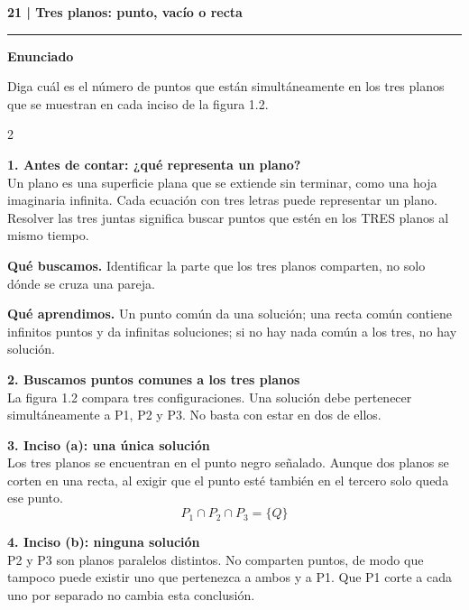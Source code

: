 \documentclass[11pt,a4paper,landscape]{article}
\newcommand{\titulo}[1]{{\LARGE\bfseries #1}\par\smallskip\hrule\medskip}
\begin{document}
\newpage{}\hypertarget{1.1-21}{}
\titulo{21 | Tres planos: punto, vacío o recta}
\textbf{Enunciado}\par Diga cuál es el número de puntos que están simultáneamente en los tres planos que se muestran en cada inciso de la figura 1.2.
\begin{multicols*}{2}
\noindent\begin{minipage}{\linewidth}\textbf{1. Antes de contar: ¿qué representa un plano?}\\[2pt]Un plano es una superficie plana que se extiende sin terminar, como una hoja imaginaria infinita. Cada ecuación con tres letras puede representar un plano. Resolver las tres juntas significa buscar puntos que estén en los TRES planos al mismo tiempo.
\par\smallskip\textbf{Qué buscamos.} Identificar la parte que los tres planos comparten, no solo dónde se cruza una pareja.
\par\smallskip\textbf{Qué aprendimos.} Un punto común da una solución; una recta común contiene infinitos puntos y da infinitas soluciones; si no hay nada común a los tres, no hay solución.
\end{minipage}\par\medskip
\noindent\begin{minipage}{\linewidth}\textbf{2. Buscamos puntos comunes a los tres planos}\\[2pt]La figura 1.2 compara tres configuraciones. Una solución debe pertenecer simultáneamente a P1, P2 y P3. No basta con estar en dos de ellos.
\end{minipage}\par\medskip
\noindent\begin{minipage}{\linewidth}\textbf{3. Inciso (a): una única solución}\\[2pt]Los tres planos se encuentran en el punto negro señalado. Aunque dos planos se corten en una recta, al exigir que el punto esté también en el tercero solo queda ese punto.
\[P_1\cap P_2\cap P_3=\{Q\}\]
\end{minipage}\par\medskip
\noindent\begin{minipage}{\linewidth}\textbf{4. Inciso (b): ninguna solución}\\[2pt]P2 y P3 son planos paralelos distintos. No comparten puntos, de modo que tampoco puede existir uno que pertenezca a ambos y a P1. Que P1 corte a cada uno por separado no cambia esta conclusión.

\end{minipage}
\end{multicols*}
\end{document}
